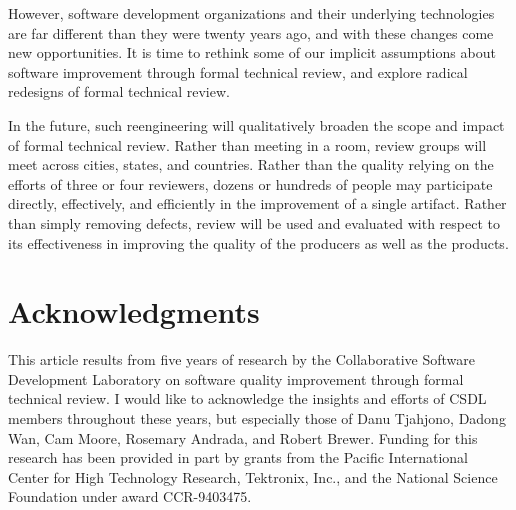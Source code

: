 However, software development organizations and their underlying
technologies are far different than they were twenty years ago, and with
these changes come new opportunities.  It is time to rethink some of our
implicit assumptions about software improvement through formal technical
review, and explore radical redesigns of formal technical review. 

In the future, such reengineering will qualitatively broaden the scope and
impact of formal technical review.  Rather than meeting in a room, review
groups will meet across cities, states, and countries.  Rather than the
quality relying on the efforts of three or four reviewers, dozens or
hundreds of people may participate directly, effectively, and efficiently
in the improvement of a single artifact. Rather than simply removing
defects, review will be used and evaluated with respect to its
effectiveness in improving the quality of the producers as well as the
products.  

\section*{Acknowledgments}

This article results from five years of research by the Collaborative
Software Development Laboratory on software quality improvement through
formal technical review.  I would like to acknowledge the
insights and efforts of CSDL members throughout these years, but especially
those of Danu Tjahjono, Dadong Wan, Cam Moore, Rosemary Andrada, and Robert
Brewer.  Funding for this research has been provided in part by grants
from the Pacific International Center for High Technology Research,
Tektronix, Inc., and the National Science Foundation under award
CCR-9403475.


\newpage
{}



     



